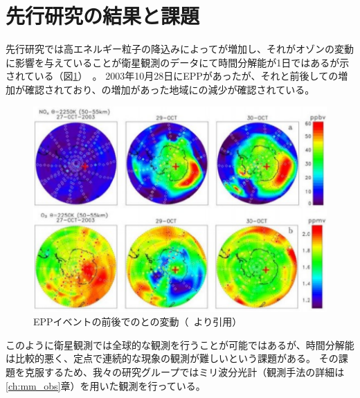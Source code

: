 \section{先行研究の結果と課題}
\label{sec:intro_privious}
先行研究では高エネルギー粒子の降込みによってが増加し、それがオゾンの変動に影響を与えていることが衛星観測のデータにて時間分解能が1日ではあるが示されている（図\ref{fig:lopez2005observation_fig3}）~\cite{lopez2005observation}。
2003年10月28日にEPPがあったが、それと前後しての増加が確認されており、の増加があった地域にの減少が確認されている。
\begin{figure}[htbp]
    \centering
    \includegraphics[width=\linewidth]{master_thesis_contents/master_thesis_fig/lopez2005observation_fig3.pdf}
    \caption{EPPイベントの前後でのとの変動（~\cite{lopez2005observation}より引用）}
    \label{fig:lopez2005observation_fig3}
\end{figure}
このように衛星観測では全球的な観測を行うことが可能ではあるが、時間分解能は比較的悪く、定点で連続的な現象の観測が難しいという課題がある。
その課題を克服するため、我々の研究グループではミリ波分光計（観測手法の詳細は\ref{ch:mm_obs}章）を用いた観測を行っている。


